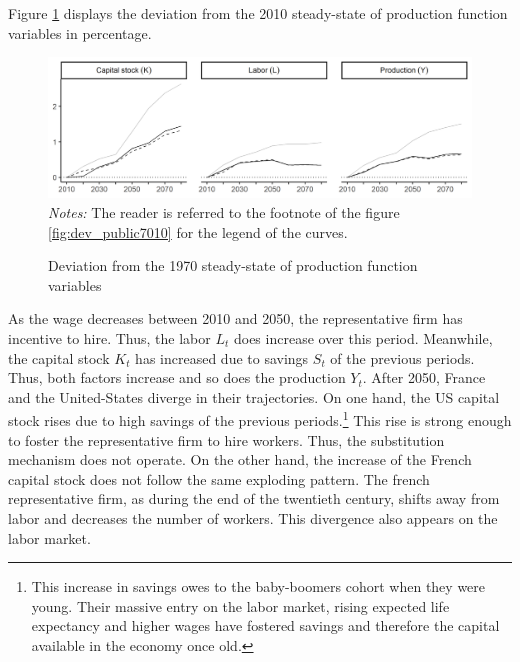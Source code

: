 Figure \ref{fig:dev_prod1080} displays the deviation from the 2010 steady-state of production function variables in percentage.
\begin{figure}[tb]
	\centering	
	\caption{Deviation from the 1970 steady-state of production function variables} \label{fig:dev_prod1080}
	\includegraphics[width=1\linewidth]{../result/deviation/dev_prod1080.png}
	\vspace{-6ex}
	\justify\singlespacing\footnotesize \textit{Notes:} The reader is referred to the footnote of the figure \ref{fig:dev_public7010} for the legend of the curves.
\end{figure}
As the wage decreases between 2010 and 2050, the representative firm has incentive to hire. Thus, the labor $L_t$ does increase over this period. Meanwhile, the capital stock $K_t$ has increased due to savings $S_t$ of the previous periods. Thus, both factors increase and so does the production $Y_t$. After 2050, France and the United-States diverge in their trajectories. On one hand, the US capital stock rises due to high savings of the previous periods.\footnote{This increase in savings owes to the baby-boomers cohort when they were young. Their massive entry on the labor market, rising expected life expectancy and higher wages have fostered savings and therefore the capital available in the economy once old.} This rise is strong enough to foster the representative firm to hire workers. Thus, the substitution mechanism does not operate. On the other hand, the increase of the French capital stock does not follow the same exploding pattern. The french representative firm, as during the end of the twentieth century, shifts away from labor and decreases the number of workers. This divergence also appears on the labor market.

